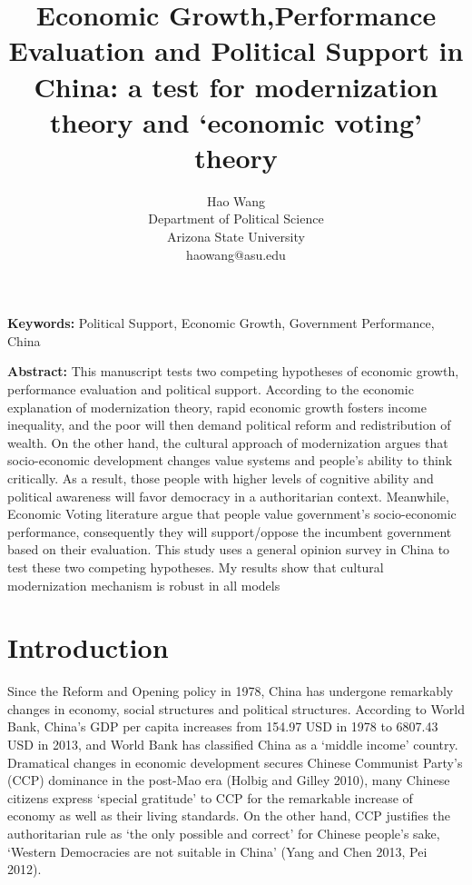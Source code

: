 \documentclass[12pt]{article}\usepackage[]{graphicx}\usepackage[]{color}
\begin{document}
\title{\textbf{Economic Growth,Performance Evaluation and Political Support in China: \large a test for modernization theory and `economic voting' theory}}
\bigskip
\onehalfspacing\author{
	Hao Wang \\ Department of Political Science\\Arizona State University\\haowang@asu.edu
	}
\maketitle \thispagestyle{empty}




\noindent \textbf{Keywords:} {Political Support, Economic Growth, Government Performance, China}

\bigskip

\noindent \textbf{Abstract:} {This manuscript tests two competing hypotheses of economic growth, performance evaluation and political support. According to the economic explanation of modernization theory, rapid economic growth fosters income inequality, and the poor will then demand political reform and redistribution of wealth. On the other hand, the cultural approach of modernization argues that socio-economic development changes value systems and people's ability to think critically. As a result, those people with higher levels of cognitive ability and political awareness will favor democracy in a authoritarian context. Meanwhile, Economic Voting literature argue that people value government's socio-economic performance, consequently they will support/oppose the incumbent government based on their evaluation. This study uses a general opinion survey in China to test these two competing hypotheses. My results show that cultural modernization mechanism is robust in all models}
\newpage

\doublespacing
\section{Introduction}
Since the Reform and Opening policy in 1978, China has undergone remarkably changes in economy, social structures and political structures. According to World Bank, China's GDP per capita increases from 154.97 USD in 1978 to 6807.43 USD in 2013, and World Bank has classified China as a `middle income' country. Dramatical changes in economic development secures Chinese Communist Party's (CCP) dominance in the post-Mao era (Holbig and Gilley 2010), many Chinese citizens express `special gratitude' to CCP for the remarkable increase of economy as well as their living standards. On the other hand, CCP justifies the authoritarian rule as `the only possible and correct' for Chinese people's sake, `Western Democracies are not suitable in China' (Yang and Chen 2013, Pei 2012).
\end{document}
